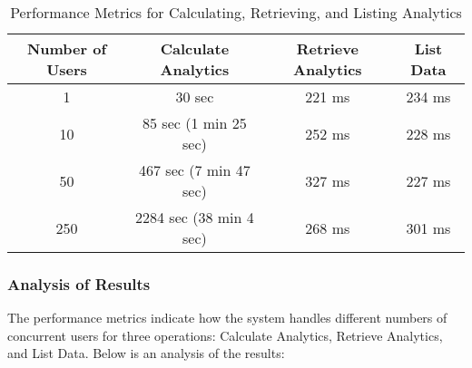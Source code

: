 \begin{table}[htbp]
\centering
\begin{tabular}{|c|c|c|c|}
\hline
\textbf{Number of Users} & \textbf{Calculate Analytics} & \textbf{Retrieve Analytics} & \textbf{List Data} \\
\hline 1 & 30 sec & 221 ms & 234 ms \\
\hline 10 & 85 sec (1 min 25 sec) & 252 ms & 228 ms \\
\hline 50 & 467 sec (7 min 47 sec) & 327 ms & 227 ms \\
\hline 250 & 2284 sec (38 min 4 sec) & 268 ms & 301 ms \\
\hline
\end{tabular}
\caption{Performance Metrics for Calculating, Retrieving, and Listing Analytics}
\label{table}
\end{table}

\subsubsection{Analysis of Results}
The performance metrics indicate how the system handles different numbers of concurrent users for three operations: Calculate Analytics, Retrieve Analytics, and List Data. Below is an analysis of the results:

